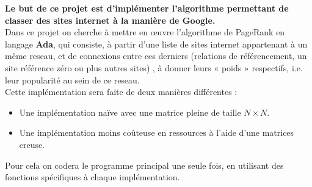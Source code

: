 
\textbf{Le but de ce projet est d'implémenter l'algorithme permettant de classer des sites internet à la manière de Google.}\\
Dans ce projet on cherche à mettre en œuvre l’algorithme de PageRank en langage \textbf{Ada}, qui consiste, à partir d’une liste de sites internet appartenant 
à un même reseau, et de connexions entre ces derniers (relations de référencement, un site référence zéro ou plus autres sites) , à donner leurs « poids » respectifs, i.e. leur 
popularité au sein de ce reseau. \\

Cette implémentation sera faite de deux manières différentes : 
\begin{itemize}
   \item Une implémentation naïve avec une matrice pleine de taille $N \times N$.
   \item Une implémentation moins coûteuse en ressources à l'aide d'une matrices creuse.
\end{itemize}

Pour cela on codera le programme principal une seule fois, en utilisant des fonctions spécifiques à chaque implémentation.